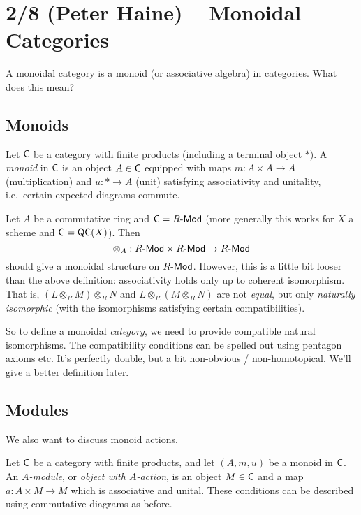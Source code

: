 \documentclass{article}
\begin{document}
\section{2/8 (Peter Haine) -- Monoidal Categories}

A monoidal category is a monoid (or associative algebra) in categories.
What does this mean?

\subsection{Monoids}

\begin{dfn}
	Let $\mathsf{C}$ be a category with finite products (including a terminal object $*$).
	A \emph{monoid} in $\mathsf{C}$ is an object $A \in \mathsf{C}$ equipped with maps $m: A \times A \to A$ (multiplication) and $u: * \to A$ (unit) satisfying associativity and unitality, i.e.\ certain expected diagrams commute.
\end{dfn}

\begin{ex}
	Let $A$ be a commutative ring and $\mathsf{C} = R\text{-}\mathsf{Mod}$ (more generally this works for $X$ a scheme and $\mathsf{C} = \mathsf{QC}(X)$).
	Then
	\[
		\otimes_A : R\text{-}\mathsf{Mod} \times R\text{-}\mathsf{Mod} \to R\text{-}\mathsf{Mod}
	\]
	should give a monoidal structure on $R\text{-}\mathsf{Mod}$.
	However, this is a little bit looser than the above definition: associativity holds only up to coherent isomorphism.
	That is, $(L \otimes_R M) \otimes_R N$ and $L \otimes_R (M \otimes_R N)$ are not \emph{equal}, but only \emph{naturally isomorphic} (with the isomorphisms satisfying certain compatibilities).
\end{ex}

So to define a monoidal \emph{category}, we need to provide compatible natural isomorphisms.
The compatibility conditions can be spelled out using pentagon axioms etc.
It's perfectly doable, but a bit non-obvious / non-homotopical.
We'll give a better definition later.

\subsection{Modules}

We also want to discuss monoid actions.

\begin{dfn}
	Let $\mathsf{C}$ be a category with finite products, and let $(A, m, u)$ be a monoid in $\mathsf{C}$.
	An \emph{$A$-module}, or \emph{object with $A$-action}, is an object $M \in \mathsf{C}$ and a map $a: A \times M \to M$ which is associative and unital.
	These conditions can be described using commutative diagrams as before.
\end{dfn}
\end{document}
